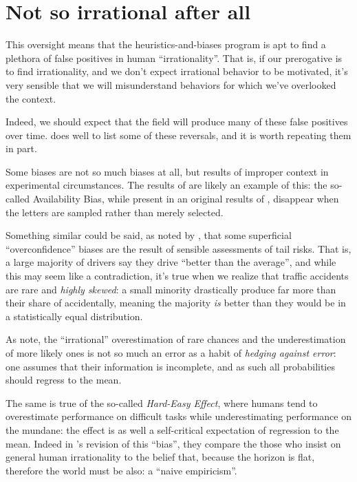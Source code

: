 \documentclass{article}
\begin{document}
\section{Not so irrational after all}

This oversight means that the heuristics-and-biases program is apt to find a plethora of false positives in human ``irrationality''.
That is, if our prerogative is to find irrationality, and we don't expect irrational behavior to be motivated, it's very sensible that we will misunderstand behaviors for which we've overlooked the context.

Indeed, we should expect that the field will produce many of these false positives over time. \textcite[14--15]{gigerenzer08} does well to list some of these reversals,  and it is worth repeating them in part.

Some biases are not so much biases at all, but results of improper context in experimental circumstances.
The results of \textcite{sedlmeier98} are likely an example of this: the so-called Availability Bias, while present in an original results of \textcite{tversky73}, disappear when the letters are sampled rather than merely selected.

Something similar could be said, as noted by \textcite{lopes92}, that some superficial ``overconfidence'' biases are the result of sensible assessments of tail risks.
That is, a large majority of drivers say they drive ``better than the average'', and while this may seem like a contradiction, it's true when we realize that traffic accidents are rare and \emph{highly skewed}: a small minority drastically produce far more than their share of accidentally, meaning the majority \emph{is} better than they would be in a statistically equal distribution.

As \textcite{hertig05} note, the ``irrational'' overestimation of rare chances and the underestimation of more likely ones is not so much an error as a habit of \emph{hedging against error}: one assumes that their information is incomplete, and as such all probabilities should regress to the mean.

The same is true of the so-called \textit{Hard-Easy Effect}, where humans tend to overestimate performance on difficult tasks while underestimating performance on the mundane: the effect is as well a self-critical expectation of regression to the mean.
Indeed in \textcite{juslin00}'s revision of this ``bias'', they compare the those who insist on general human irrationality to the belief that, because the horizon is flat, therefore the world must be also: a ``naive empiricism''.
\end{document}
